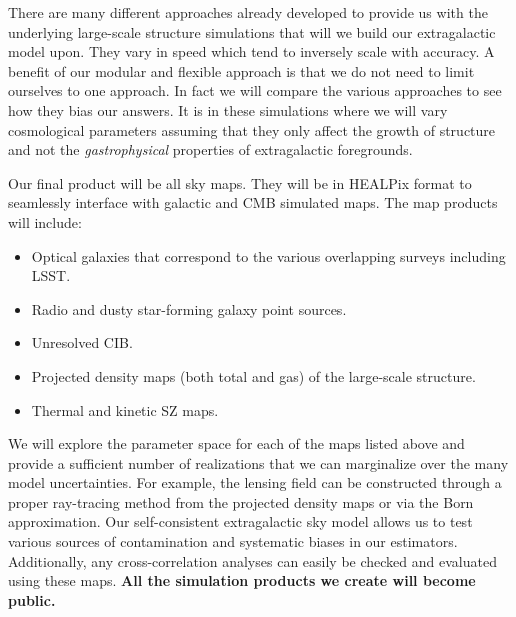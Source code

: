 There are many different approaches already developed to provide us with the underlying large-scale structure simulations that will we build our extragalactic model upon. They vary in speed which tend to inversely scale with accuracy. A benefit of our modular and flexible approach is that we do not need to limit ourselves to one approach. In fact we will compare the various approaches to see how they bias our answers. It is in these simulations where we will vary cosmological parameters assuming that they only affect the growth of structure and not the {\it gastrophysical} properties of extragalactic foregrounds.

Our final product will be all sky maps. They will be in HEALPix \cite{Gorski:2004by} format to seamlessly interface with galactic and CMB simulated maps. The map products will include:

\begin{itemize}
\item Optical galaxies that correspond to the various overlapping surveys including LSST.
\item Radio and dusty star-forming galaxy point sources.
\item Unresolved CIB.
\item Projected density maps (both total and gas) of the large-scale structure.
\item Thermal and kinetic SZ maps.
\end{itemize}

\noindent We will explore the parameter space for each of the maps listed above and provide a sufficient number of realizations that we can marginalize over the many model uncertainties. For example, the lensing field can be constructed through a proper ray-tracing method from the projected density maps or via the Born approximation. Our self-consistent extragalactic sky model allows us to test various sources of contamination and systematic biases in our estimators. Additionally, any cross-correlation analyses can easily be checked and evaluated using these maps. {\bf All the simulation products we create will become public.}

%



